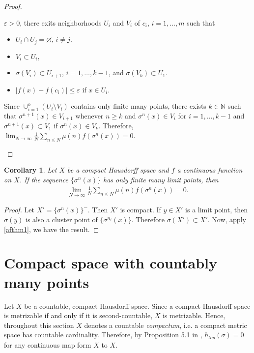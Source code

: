 \documentclass[a4paper,10pt]{amsart}
\newtheorem{corollary}{Corollary}[section]
\newcommand{\N}{\mathbb N} %
\begin{document}
\begin{proof}
\begin{enumerate}[resume]
            $\varepsilon > 0$, there exits 
        neighborhoods $U_i$ and $V_{i}$ of $c_i$, $i = 1, \ldots, m$ such
        that
            \begin{itemize}
                \item $U_i \cap U_j = \varnothing$, $i \neq j$.
                \item $V_i \subset U_i$, 
                \item $\sigma(V_i) \subset U_{i + 1}$, $i = 1, \ldots, k-1$,
                    and $\sigma(V_k) \subset U_{1}$.
                \item $|f(x) - f(c_i)| \leq \varepsilon$ if $x \in U_i$.
            \end{itemize}
            Since $\cup_{i=1}^{k}(U_i \setminus V_i)$ contains only finite
            many points, there exists $k \in \N$ such that 
            $\sigma^{n+1}(x) \in V_{i+1}$ whenever $n \geq k$ and
            $\sigma^{n}(x) \in V_i$  
            for $i = 1, \ldots, k-1$ and
            $\sigma^{n+1}(x) \subset V_{1}$ if $\sigma^{n}(x) \in V_k$.
            Therefore, 
            $\lim_{N \rightarrow \infty}
            \frac{1}{N} \sum_{n \leq N}\mu(n)f(\sigma^{n}(x)) = 0$.
    \end{enumerate}
\end{proof}

\begin{corollary} \label{afcor1}
   Let $X$ be a compact Hausdorff space and $f$ a continuous function 
   on $X$. If the sequence $\{ \sigma^{n}(x)\}$ has only finite many 
   limit points, then
   \begin{align*}
      \lim_{N \rightarrow \infty}
       \frac{1}{N} \sum_{n \leq N}\mu(n)f(\sigma^{n}(x)) = 0.
   \end{align*}
\end{corollary}

\begin{proof}
    Let $X' = \{ \sigma^{n}(x)\}^{-}$. Then $X'$ is compact. 
    If $y \in X'$ is a limit point,
    then $\sigma(y)$ is also a cluster point of $\{\sigma^{n_i}(x)\}$.
    Therefore $\sigma(X') \subset X'$. Now, apply \cref{afthm1}, we
    have the result.
\end{proof}

\section{Compact space with countably many points}
Let $X$ be a countable, compact Hausdorff space.
Since a compact Hausdorff space is metrizable if and only if it is 
second-countable, $X$ is metrizable. 
Hence, throughout this section $X$ denotes a countable
\textit{compactum}, i.e. a compact metric space has countable cardinality.
Therefore, by Proposition 5.1 in \cite{JO}, 
$h_{top}(\sigma) = 0$ for any continuous map form $X$ to $X$.
\end{document}
